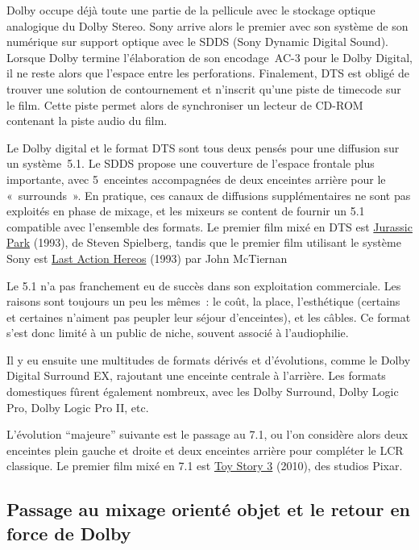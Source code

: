 \documentclass[
  letterpaper,
  DIV=11,
  numbers=noendperiod]{scrreprt}
\begin{document}
Dolby occupe déjà toute une partie de la pellicule avec le stockage
optique analogique du Dolby Stereo. Sony arrive alors le premier avec
son système de son numérique sur support optique avec le SDDS (Sony
Dynamic Digital Sound). Lorsque Dolby termine l'élaboration de son
encodage~AC-3 pour le Dolby Digital, il ne reste alors que l'espace
entre les perforations. Finalement, DTS est obligé de trouver une
solution de contournement et n'inscrit qu'une piste de timecode sur le
film. Cette piste permet alors de synchroniser un lecteur de CD-ROM
contenant la piste audio du film.

Le Dolby digital et le format DTS sont tous deux pensés pour une
diffusion sur un système~5.1. Le SDDS propose une couverture de l'espace
frontale plus importante, avec 5~enceintes accompagnées de deux
enceintes arrière pour le «~surrounds~». En pratique, ces canaux de
diffusions supplémentaires ne sont pas exploités en phase de mixage, et
les mixeurs se content de fournir un 5.1 compatible avec l'ensemble des
formats. Le premier film mixé en DTS est
\href{https://fr.wikipedia.org/wiki/Jurassic_Park}{Jurassic Park}
(1993), de Steven Spielberg, tandis que le premier film utilisant le
système Sony est
\href{https://fr.wikipedia.org/wiki/Last_Action_Hero}{Last Action
Hereos} (1993) par John McTiernan

Le 5.1 n'a pas franchement eu de succès dans son exploitation
commerciale. Les raisons sont toujours un peu les mêmes~: le coût, la
place, l'esthétique (certains et certaines n'aiment pas peupler leur
séjour d'enceintes), et les câbles. Ce format s'est donc limité à un
public de niche, souvent associé à l'audiophilie.

Il y eu ensuite une multitudes de formats dérivés et d'évolutions, comme
le Dolby Digital Surround EX, rajoutant une enceinte centrale à
l'arrière. Les formats domestiques fûrent également nombreux, avec les
Dolby Surround, Dolby Logic Pro, Dolby Logic Pro II, etc.

L'évolution ``majeure'' suivante est le passage au 7.1, ou l'on
considère alors deux enceintes plein gauche et droite et deux enceintes
arrière pour compléter le LCR classique. Le premier film mixé en 7.1 est
\href{https://en.wikipedia.org/wiki/Toy_Story_3}{Toy Story 3} (2010),
des studios Pixar.

\hypertarget{passage-au-mixage-orientuxe9-objet-et-le-retour-en-force-de-dolby}{%
\subsection{Passage au mixage orienté objet et le retour en force de
Dolby}\label{passage-au-mixage-orientuxe9-objet-et-le-retour-en-force-de-dolby}}
\end{document}
